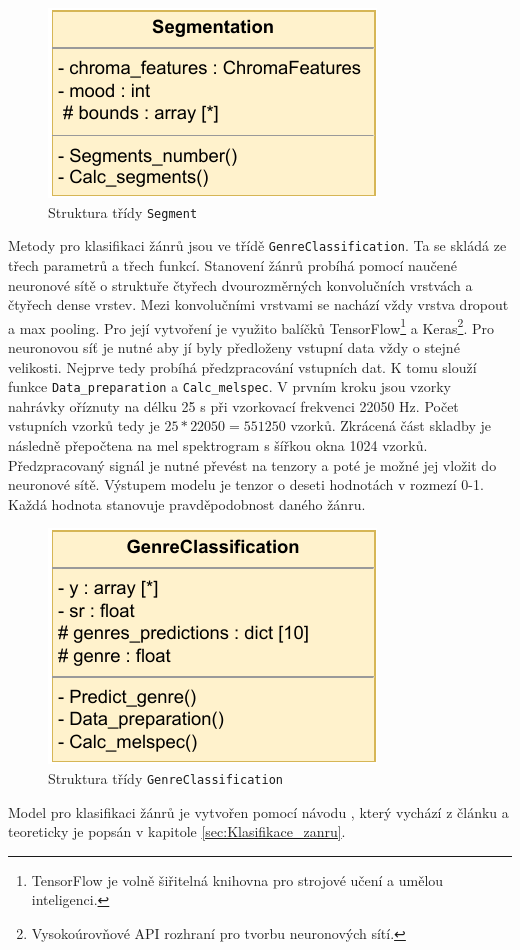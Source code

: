 \begin{figure}[H]
    \centering
    \includegraphics[width = 0.3\linewidth]{obrazky/UML_diagram_Segmentation.pdf}
    \caption{Struktura třídy \texttt{Segment}}
    \label{fig:Segmentation_diagram}
\end{figure}

Metody pro klasifikaci žánrů jsou ve třídě \texttt{GenreClassification}. Ta se skládá ze třech parametrů a třech funkcí. Stanovení žánrů probíhá pomocí naučené neuronové sítě o struktuře čtyřech dvourozměrných konvolučních vrstvách a čtyřech dense vrstev. Mezi konvolučními vrstvami se nachází vždy vrstva dropout a max pooling. Pro její vytvoření je využito balíčků TensorFlow\footnote{TensorFlow je volně šiřitelná knihovna pro strojové učení a umělou inteligenci.} a Keras\footnote{Vysokoúrovňové API rozhraní pro tvorbu neuronových sítí.}. Pro neuronovou síť je nutné aby jí byly předloženy vstupní data vždy o stejné velikosti. Nejprve tedy probíhá předzpracování vstupních dat. K tomu slouží funkce \texttt{Data\_preparation} a \texttt{Calc\_melspec}. V prvním kroku jsou vzorky nahrávky oříznuty na délku 25 s při vzorkovací frekvenci 22050 Hz. Počet vstupních vzorků tedy je $25 * 22050 = 551250$ vzorků. Zkrácená část skladby je následně přepočtena na mel spektrogram s šířkou okna 1024 vzorků. Předzpracovaný signál je nutné převést na tenzory a poté je možné jej vložit do neuronové sítě. Výstupem modelu je tenzor o deseti hodnotách v rozmezí 0-1. Každá hodnota stanovuje pravděpodobnost daného žánru. 

\begin{figure}[H]
    \centering
    \includegraphics[width = 0.3\linewidth]{obrazky/UML_diagramy_GenreClassification.pdf}
    \caption{Struktura třídy \texttt{GenreClassification}}
    \label{fig:GenreClassification_diagram}
\end{figure}

Model pro klasifikaci žánrů je vytvořen pomocí návodu  \cite{Music_classification_using_deep_learning}, který vychází z článku \cite{Music_genre_classification_paper} a teoreticky je popsán v kapitole \ref{sec:Klasifikace_zanru}. 

